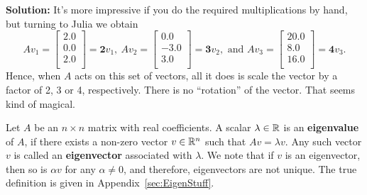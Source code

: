\textbf{Solution:} It's more impressive if you do the required multiplications by hand, but turning to Julia we obtain
\begin{equation}
A v_1 = \left[
\begin{array}{r}
2.0 \\
0.0 \\
2.0 \\
\end{array}
\right] = \mathbf{2} v_1, ~A v_2 = \left[
\begin{array}{r}
0.0 \\
-3.0 \\
3.0 \\
\end{array}
\right] = \mathbf{3} v_2, \text{ and } A v_3 = \left[
\begin{array}{r}
20.0 \\
8.0 \\
16.0 \\
\end{array}
\right] = \mathbf{4} v_3.
\end{equation}
Hence, when $A$ acts on this set of vectors, all it does is scale the vector by a factor of 2, 3 or 4, respectively. There is no ``rotation'' of the vector. That seems kind of magical. 
\Qed



\vspace*{.2cm}

\begin{tcolorbox}[title=\textbf{\Large Eigen Stuff: Temporary Definitions}]
 Let $A$ be an $n\times n$ matrix with real coefficients. A scalar $\lambda \in \mathbb R$ is an \textbf{eigenvalue} of $A$, if there exists a non-zero vector $v \in \mathbb R^{n}$ such that $A  v=\lambda v$. Any such vector $v$ is called an \textbf{eigenvector} associated with $\lambda$. We note that if $v$ is an eigenvector, then so is $\alpha v$ for any $\alpha \neq 0$, and therefore, eigenvectors are not unique. The true definition is given in Appendix~\ref{sec:EigenStuff}.
\end{tcolorbox}

